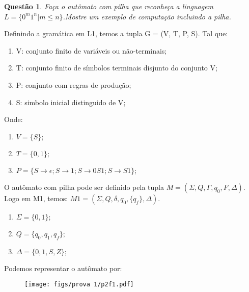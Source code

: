 \documentclass{article}
\newtheorem{problem}{Questão}
\begin{document}
    \begin{problem}
        Faça o autômato com pilha que reconheça a linguagem 
        $L = \{ 0^m1^n | m \leq n \}$.Mostre um exemplo de computação incluindo a pilha. 
    \end{problem}
    
    \begin{solution}
        Definindo a gramática em L1, temos a tupla G = (V, T, P, S). Tal que:
        
        \begin{enumerate}[label=]
            \item V: conjunto finito de variáveis ou não-terminais;
            \item T: conjunto finito de símbolos terminais disjunto do conjunto V;
            \item P: conjunto com regras de produção;
            \item S: simbolo inicial distinguido de V;
        \end{enumerate}

        Onde: 
        \begin{enumerate}[label=]
            \item $V = \{S\};$
            \item $T = \{0, 1\};$
            \item $P = \{S \rightarrow \epsilon; S \rightarrow  1; S \rightarrow  0S1; S \rightarrow S1\};$
        \end{enumerate}
        
        O autômato com pilha pode ser definido pela tupla $M = (\Sigma, Q, \Gamma, q_0, F, \Delta)$. Logo em M1, temos: $M1 = (\Sigma, Q, \delta, q_0, \{q_f\}, \Delta)$.
        
       \begin{enumerate}[label=]
            \item $\Sigma = \{0, 1\};$
            \item $Q = \{q_0, q_1, q_f\};$
            \item $\Delta = \{0, 1, S, Z\};$
        \end{enumerate}
        
        Podemos representar o autômato por:
        \begin{figure}[H]
             \centering
             \texttt{[image: figs/prova 1/p2f1.pdf]}
        \end{figure}
        
    \end{solution}
\end{document}
